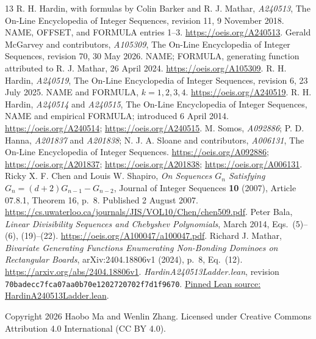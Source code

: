 \documentclass[11pt]{article}
\begin{document}
\begin{thebibliography}{13}
 R. H. Hardin, with formulas by Colin Barker and
R. J. Mathar, \emph{A240513}, The On-Line Encyclopedia of Integer Sequences,
revision 11, 9 November 2018. NAME, OFFSET, and FORMULA entries 1--3.
\url{https://oeis.org/A240513}.
 Gerald McGarvey and contributors, \emph{A105309},
The On-Line Encyclopedia of Integer Sequences, revision 70,
30 May 2026. NAME; FORMULA, generating function attributed to
R. J. Mathar, 26 April 2024. \url{https://oeis.org/A105309}.
 R. H. Hardin, \emph{A240519},
The On-Line Encyclopedia of Integer Sequences, revision 6,
23 July 2025. NAME and FORMULA, $k=1,2,3,4$.
\url{https://oeis.org/A240519}.
 R. H. Hardin, \emph{A240514} and \emph{A240515},
The On-Line Encyclopedia of Integer Sequences, NAME and empirical
FORMULA; introduced 6 April 2014.
\url{https://oeis.org/A240514}; \url{https://oeis.org/A240515}.
 M. Somos, \emph{A092886}; P. D. Hanna,
\emph{A201837} and \emph{A201838}; N. J. A. Sloane and contributors,
\emph{A006131}, The On-Line Encyclopedia of Integer Sequences.
\url{https://oeis.org/A092886}; \url{https://oeis.org/A201837};
\url{https://oeis.org/A201838}; \url{https://oeis.org/A006131}.
 Ricky X. F. Chen and Louis W. Shapiro,
\emph{On Sequences $G_n$ Satisfying $G_n=(d+2)G_{n-1}-G_{n-2}$},
Journal of Integer Sequences \textbf{10} (2007), Article 07.8.1,
Theorem 16, p.~8. Published 2 August 2007.
\url{https://cs.uwaterloo.ca/journals/JIS/VOL10/Chen/chen509.pdf}.
 Peter Bala,
\emph{Linear Divisibility Sequences and Chebyshev Polynomials},
March 2014, Eqs.~(5)--(6), (19)--(22).
\url{https://oeis.org/A100047/a100047.pdf}.
 Richard J. Mathar,
\emph{Bivariate Generating Functions Enumerating Non-Bonding Dominoes
on Rectangular Boards}, arXiv:2404.18806v1 (2024), p.~8, Eq.~(12).
\url{https://arxiv.org/abs/2404.18806v1}.
 \emph{HardinA240513Ladder.lean}, revision
\texttt{70badecc7fca07aa0b70e1202720702f7d1f9670}.
\href{https://github.com/the-omega-institute/trureturing/blob/70badecc7fca07aa0b70e1202720702f7d1f9670/D5/S3/Combinatorics/TraceAvoidingArrays/HardinA240513Ladder.lean}{Pinned Lean source: HardinA240513Ladder.lean}.
\end{thebibliography}

\noindent\small Copyright 2026 Haobo Ma and Wenlin Zhang.
Licensed under Creative Commons Attribution 4.0 International (CC BY 4.0).
\end{document}
